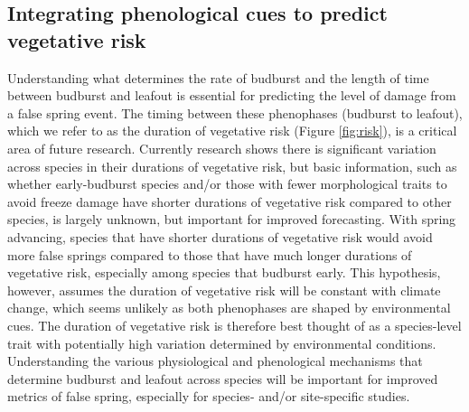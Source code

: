 \documentclass{article}\usepackage[]{graphicx}\usepackage[]{color}
\begin{document}
\subsection*{Integrating phenological cues to predict vegetative risk}
Understanding what determines the rate of budburst and the length of time between budburst and leafout is essential for predicting the level of damage from a false spring event. The timing between these phenophases (budburst to leafout), which we refer to as the duration of vegetative risk (Figure \ref{fig:risk}), is a critical area of future research. Currently research shows there is significant variation across species in their durations of vegetative risk, but basic information, such as whether early-budburst species and/or those with fewer morphological traits to avoid freeze damage have shorter durations of vegetative risk compared to other species, is largely unknown, but important for improved forecasting. With spring advancing, species that have shorter durations of vegetative risk would avoid more false springs compared to those that have much longer durations of vegetative risk, especially among species that budburst early. This hypothesis, however, assumes the duration of vegetative risk will be constant with climate change, which seems unlikely as both phenophases are shaped by environmental cues. The duration of vegetative risk is therefore best thought of as a species-level trait with potentially high variation determined by environmental conditions. Understanding the various physiological and phenological mechanisms that determine budburst and leafout across species will be important for improved metrics of false spring, especially for species- and/or site-specific studies. 
\end{document}
